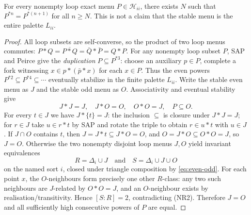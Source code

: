 \begin{lemma}
\label{lem:typed-loop-stable}
For every nonempty loop exact menu $P\in\mathcal H_{ii}$,
there exists $N$ such that $P^{*n}=P^{*(n+1)}$ for all $n\ge N$.
This is not a claim that the stable menu is the entire palette
$L_{ii}$.
\end{lemma}
\begin{proof}
All loop subsets are self-converse, so the product of two loop
menus commutes:
$P*Q=\overline{P*Q}=\bar Q*\bar P=Q*P$.
For any nonempty loop subset $P$, SAP and Peirce give the
\emph{duplication} $P\subseteq P^{*3}$: choose an auxiliary
$p\in P$, complete a fork witnessing $x\in p*(\bar p*x)$
for each $x\in P$.  Thus the even powers
$P^{*2}\subseteq P^{*4}\subseteq\cdots$ eventually stabilize
in the finite palette $L_{ii}$.  Write the stable even menu as $J$
and the stable odd menu as $O$.  Associativity and eventual
stability give
\begin{equation}\label{eq:even-odd}
 J*J=J,\quad J*O=O,\quad O*O=J,\quad P\subseteq O.
\end{equation}
For every $t\in J$ we have $J*\{t\}=J$:
the inclusion $\subseteq$ is closure under $J*J=J$;
for $r\in J$ take $u\in r*t$ by SAP and rotate the triple to
obtain $r\in u*t$ with $u\in J$.  If $J\cap O$ contains $t$,
then
$J=J*t\subseteq J*O=O$, and
$O=J*O\subseteq O*O=J$,
so $J=O$.  Otherwise the two nonempty disjoint loop menus
$J,O$ yield invariant equivalences
\[
 R=\Delta_i\cup J\quad\text{and}\quad
 S=\Delta_i\cup J\cup O
\]
on the named sort $i$, closed under triangle composition by
\eqref{eq:even-odd}.  For each point $x$, the $O$-neighbours
form precisely one other $R$-class: any two such neighbours
are $J$-related by $O*O=J$, and an $O$-neighbour exists by
realisation/transitivity.  Hence $[S:R]=2$, contradicting (NR2).
Therefore $J=O$ and all sufficiently high consecutive powers of
$P$ are equal.
\end{proof}

